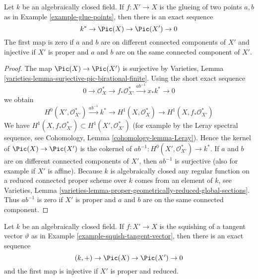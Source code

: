 \begin{lemma}
\label{lemma-glue-points}
Let $k$ be an algebraically closed field. If $f : X' \to X$ is the
glueing of two points $a, b$ as in Example \ref{example-glue-points}, then
there is an exact sequence
$$
k^* \to \Pic(X) \to \Pic(X') \to 0
$$
The first map is zero if $a$ and $b$ are on different
connected components of $X'$ and injective
if $X'$ is proper and $a$ and $b$ are on the same connected component of $X'$.
\end{lemma}

\begin{proof}
The map $\Pic(X) \to \Pic(X')$ is surjective
by Varieties, Lemma \ref{varieties-lemma-surjective-pic-birational-finite}.
Using the short exact sequence
$$
0 \to \mathcal{O}_X^* \to f_*\mathcal{O}_{X'}^*
\xrightarrow{ab^{-1}} x_*k^* \to 0
$$
we obtain
$$
H^0(X', \mathcal{O}_{X'}^*) \xrightarrow{ab^{-1}} k^* \to
H^1(X, \mathcal{O}_X^*) \to H^1(X, f_*\mathcal{O}_{X'}^*)
$$
We have $H^1(X, f_*\mathcal{O}_{X'}^*) \subset H^1(X', \mathcal{O}_{X'}^*)$
(for example by the Leray spectral sequence, see
Cohomology, Lemma \ref{cohomology-lemma-Leray}).
Hence the kernel of $\Pic(X) \to \Pic(X')$ is the
cokernel of $ab^{-1} : H^0(X', \mathcal{O}_{X'}^*) \to k^*$.
If $a$ and $b$ are on different connected components of $X'$,
then $ab^{-1}$ is surjective (also for example if $X'$ is affine).
Because $k$ is algebraically closed any regular function on a
reduced connected proper scheme over $k$ comes from an element of $k$, see
Varieties, Lemma
\ref{varieties-lemma-proper-geometrically-reduced-global-sections}.
Thus $ab^{-1}$ is zero if $X'$ is proper and $a$ and $b$ are on
the same connected component.
\end{proof}

\begin{lemma}
\label{lemma-squish-tangent-vector}
Let $k$ be an algebraically closed field. If $f : X' \to X$ is the
squishing of a tangent vector $\vartheta$ as in
Example \ref{example-squish-tangent-vector}, then
there is an exact sequence
$$
(k, +) \to \Pic(X) \to \Pic(X') \to 0
$$
and the first map is injective if $X'$ is proper and reduced.
\end{lemma}

